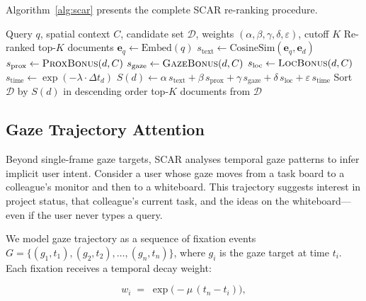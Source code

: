 \documentclass[journal]{IEEEtran}
\begin{document}
Algorithm~\ref{alg:scar} presents the complete SCAR re-ranking
procedure.

\begin{algorithm}[t]
\caption{SCAR Re-ranking Procedure}
\label{alg:scar}
\begin{algorithmic}[1]
\REQUIRE Query $q$, spatial context $C$, candidate set $\mathcal{D}$,
         weights $(\alpha,\beta,\gamma,\delta,\varepsilon)$, cutoff $K$
\ENSURE  Re-ranked top-$K$ documents
\STATE $\mathbf{e}_q \leftarrow \mathrm{Embed}(q)$
  \STATE $s_{\mathrm{text}} \leftarrow \mathrm{CosineSim}(\mathbf{e}_q, \mathbf{e}_d)$
  \STATE $s_{\mathrm{prox}} \leftarrow \textsc{ProxBonus}(d, C)$
  \STATE $s_{\mathrm{gaze}} \leftarrow \textsc{GazeBonus}(d, C)$
  \STATE $s_{\mathrm{loc}}  \leftarrow \textsc{LocBonus}(d, C)$
  \STATE $s_{\mathrm{time}} \leftarrow \exp(-\lambda \cdot \Delta t_d)$
  \STATE $S(d) \leftarrow \alpha\, s_{\mathrm{text}}
                         + \beta\, s_{\mathrm{prox}}
                         + \gamma\, s_{\mathrm{gaze}}
                         + \delta\, s_{\mathrm{loc}}
                         + \varepsilon\, s_{\mathrm{time}}$
\ENDFOR
\STATE Sort $\mathcal{D}$ by $S(d)$ in descending order
\RETURN top-$K$ documents from $\mathcal{D}$
\end{algorithmic}
\end{algorithm}

\subsection{Gaze Trajectory Attention}
\label{ssec:gaze_trajectory}

Beyond single-frame gaze targets, SCAR analyses temporal gaze
patterns to infer implicit user intent.  Consider a user whose gaze
moves from a task board to a colleague's monitor and then to a
whiteboard.  This trajectory suggests interest in project status, that
colleague's current task, and the ideas on the whiteboard---even if
the user never types a query.

We model gaze trajectory as a sequence of fixation events
$G = \{(g_1, t_1), (g_2, t_2), \ldots, (g_n, t_n)\}$, where $g_i$
is the gaze target at time $t_i$.  Each fixation receives a temporal
decay weight:

\begin{equation}
  w_i \;=\; \exp\!\bigl(-\mu\,(t_n - t_i)\bigr),
  \label{eq:gaze_decay}
\end{equation}
\end{document}
